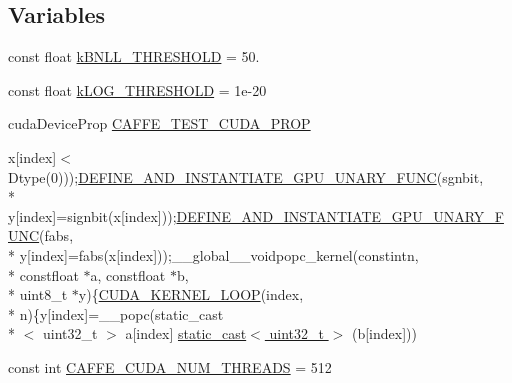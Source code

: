 \subsection*{Variables}
\begin{DoxyCompactItemize}
\item 
const float \hyperlink{namespacecaffe_a01b89e7dac7d83e43840af4a4415589d}{k\+B\+N\+L\+L\+\_\+\+T\+H\+R\+E\+S\+H\+O\+L\+D} = 50.
\item 
const float \hyperlink{namespacecaffe_addfe87008440b3c5636d308f5189de6f}{k\+L\+O\+G\+\_\+\+T\+H\+R\+E\+S\+H\+O\+L\+D} = 1e-\/20
\item 
cuda\+Device\+Prop \hyperlink{namespacecaffe_a52c3f55acde538ca266106c6bcf31159}{C\+A\+F\+F\+E\+\_\+\+T\+E\+S\+T\+\_\+\+C\+U\+D\+A\+\_\+\+P\+R\+O\+P}
\item 
x\mbox{[}index\mbox{]}$<$ Dtype(0)));\hyperlink{math__functions_8hpp_ae57554839d87a430797d905d402e9d62}{D\+E\+F\+I\+N\+E\+\_\+\+A\+N\+D\+\_\+\+I\+N\+S\+T\+A\+N\+T\+I\+A\+T\+E\+\_\+\+G\+P\+U\+\_\+\+U\+N\+A\+R\+Y\+\_\+\+F\+U\+N\+C}(sgnbit, \\*
y\mbox{[}index\mbox{]}=signbit(x\mbox{[}index\mbox{]}));\hyperlink{math__functions_8hpp_ae57554839d87a430797d905d402e9d62}{D\+E\+F\+I\+N\+E\+\_\+\+A\+N\+D\+\_\+\+I\+N\+S\+T\+A\+N\+T\+I\+A\+T\+E\+\_\+\+G\+P\+U\+\_\+\+U\+N\+A\+R\+Y\+\_\+\+F\+U\+N\+C}(fabs, \\*
y\mbox{[}index\mbox{]}=fabs(x\mbox{[}index\mbox{]}));\+\_\+\+\_\+global\+\_\+\+\_\+voidpopc\+\_\+kernel(constintn, \\*
constfloat $\ast$a, constfloat $\ast$b, \\*
uint8\+\_\+t $\ast$y)\{\hyperlink{common_8hpp_aab638495f8b2376fdef4c318cee7b8c3}{C\+U\+D\+A\+\_\+\+K\+E\+R\+N\+E\+L\+\_\+\+L\+O\+O\+P}(index, \\*
n)\{y\mbox{[}index\mbox{]}=\+\_\+\+\_\+popc(static\+\_\+cast\\*
$<$ uint32\+\_\+t $>$ a\mbox{[}index\mbox{]} \hyperlink{namespacecaffe_a91eff1fdaaf60428c47eae6950deffb1}{static\+\_\+cast$<$ uint32\+\_\+t $>$} (b\mbox{[}index\mbox{]}))
\item 
const int \hyperlink{namespacecaffe_a10ad8f44dec37737a660d1d5439b9cca}{C\+A\+F\+F\+E\+\_\+\+C\+U\+D\+A\+\_\+\+N\+U\+M\+\_\+\+T\+H\+R\+E\+A\+D\+S} = 512
\end{DoxyCompactItemize}


